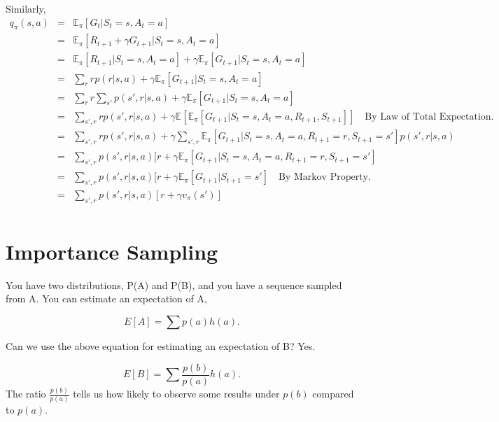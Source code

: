 \begin{appendices}
Similarly,
\begin{eqnarray*}
q_\pi(s,a) &=& \mathbb{E}_\pi[G_t|S_t=s,A_t=a]\\
&=&\mathbb{E}_\pi[R_{t+1} + \gamma G_{t+1}|S_t=s,A_t=a]\\
&=&\mathbb{E}_\pi[R_{t+1}|S_t=s,A_t=a] + \gamma\mathbb{E}_\pi[G_{t+1}|S_t=s,A_t=a]\\
&=&\sum_r rp(r|s,a) + \gamma\mathbb{E}_\pi[G_{t+1}|S_t=s,A_t=a]\\
&=&\sum_r r\sum_{s'}p(s',r|s,a) + \gamma\mathbb{E}_\pi[G_{t+1}|S_t=s,A_t=a]\\
&=&\sum_{s',r}rp(s',r|s,a) + \gamma\mathbb{E}[\mathbb{E}_\pi[G_{t+1}|S_t=s,A_t=a,R_{t+1},S_{t+1}]] \quad \text{By Law of Total Expectation.}\\
&=&\sum_{s',r} rp(s',r|s,a) + \gamma\sum_{s',r}\mathbb{E}_\pi[G_{t+1}|S_t=s,A_t=a,R_{t+1}=r,S_{t+1}=s']p(s',r|s,a)\\
&=&\sum_{s',r} p(s',r|s,a)[r + \gamma\mathbb{E}_\pi[G_{t+1}|S_t=s,A_t=a,R_{t+1}=r,S_{t+1}=s']\\
	&=&\sum_{s',r} p(s',r|s,a)[r + \gamma\mathbb{E}_\pi[G_{t+1}|S_{t+1}=s'] \quad \text{By Markov Property.}\\
&=&\sum_{s',r} p(s',r|s,a)[r + \gamma v_\pi(s')]\\
\end{eqnarray*}

\section{Importance Sampling}
You have two distributions, P(A) and P(B), and you have a sequence sampled from A. You can estimate an expectation of A, 

$$E[A] = \sum p(a)h(a).$$

Can we use the above equation for estimating an expectation of B? Yes.

$$E[B] = \sum \frac{p(b)}{p(a)}h(a).$$
The ratio $\frac{p(b)}{p(a)}$ tells us how likely to observe some results under $p(b)$ compared to $p(a)$.




\end{appendices}
